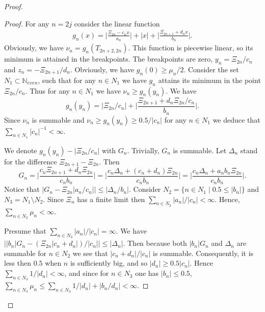 \begin{proof}
\begin{proof}
        For any $n = 2j$ consider the linear function
        \begin{align*}
          g_{n}(x) = \Big\lvert \frac{\Xi_{2n} - c_{n} x}{a_{n}} \Big\rvert +
                   \lvert x \rvert +
                   \Big\lvert \frac{\Xi_{2n+1} + d_{n} x}{b_{n}} \Big\rvert.
        \end{align*}
        Obviously, we have $\nu_{n} = g_{n}(T_{2n+2, 2n})$.
        This function is piecewise linear, so its minimum is attained in the breakpoints.
        The breakpoints are zero, $y_n = \Xi_{2n}/c_n$ and $z_n = -\Xi_{2n+1}/d_n$.
        Obviously, we have $g_n(0) \geq \mu_n/2$.
        Consider the set $N_1 \subset \mathbb{N}_{{even}}$, such that for any $n \in N_1$ we have $g_n$ attains its minimum in
          the point $\Xi_{2n}/c_n$.
        Thus for any $n\in N_1$ we have $\nu_n \geq g_n(y_n)$.
        We have
        \[
          g_n(y_n) = \Big\lvert \Xi_{2n}/c_n \Big\rvert +
                   \Big\lvert \frac{\Xi_{2n+1} + d_{n} \Xi_{2n}/c_n}{b_{n}} \Big\rvert.
        \]
        Since $\nu_n$ is summable and $\nu_n \geq g_n(y_n) \geq 0.5/|c_n|$ for any $n \in N_1$
          we deduce that $\sum_{n \in N_1} |c_n|^{-1} < \infty$.

        We denote $g_n(y_n) - \Big\lvert \Xi_{2n}/c_n \Big\rvert$ with $G_n$.
        Trivially, $G_n$ is summable.
        Let $\Delta_n$ stand for the difference $\Xi_{2n+1} - \Xi_{2n}$.
        Then
        \[
          G_n = \Big\lvert \frac{c_n \Xi_{2n+1} + d_{n} \Xi_{2n}}{c_n b_n} \Big\rvert
            = \Big\lvert \frac{c_n \Delta_n + (c_n + d_n) \Xi_{2n}}{c_n b_n} \Big\rvert
            = \Big\lvert \frac{c_n \Delta_n + a_n b_n\Xi_{2n}}{c_n b_n} \Big\rvert.
        \]
        Notice that
          $\big\lvert G_n - \Xi_{2n}\lvert a_n/c_n\rvert \big\rvert \leq \lvert \Delta_n/b_n \rvert$.
        Consider $N_2 = \{n\in N_1 \mid 0.5 \leq \lvert b_n \rvert\}$ and $N_3 = N_1 \setminus N_2$.
        Since $\Xi_n$ has a finite limit then $\sum_{n \in N_2} |a_n|/|c_n| < \infty$.
        Hence, $\sum_{n \in N_2} \mu_n < \infty$.

        Presume that $\sum_{n \in N_3} |a_n|/|c_n| = \infty$.
        We have $\lvert |b_n| G_n - (\Xi_{2n}|c_n + d_n|)/|c_n|\rvert \leq \lvert \Delta_n \rvert$.
        Then because both $|b_n| G_n$ and $\Delta_n$ are summable for $n \in N_2$ we see that
          $|c_n + d_n| / |c_n|$ is summable.
        Consequently, it is less then $0.5$ when $n$ is sufficiently big, and so $|d_n| \geq 0.5|c_n|$.
        Hence $\sum_{n \in N_3} 1/|d_n| < \infty$, and since for $n \in N_3$ one has $\lvert b_n \rvert \leq 0.5$,
          $\sum_{n\in N_3} \mu_n \leq \sum_{n \in N_3} 1/\lvert d_n \rvert + \lvert b_n / d_n \rvert < \infty$.


\end{proof}
\end{proof}
